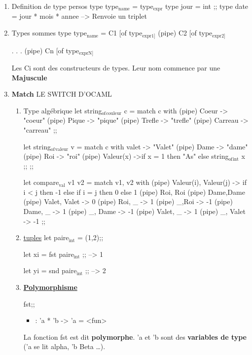 \documentclass[11pt]{article}
\begin{document}
\begin{enumerate}
\item Definition de type persos
\label{sec-1-4-4-1}
type type$_{\text{name}}$ = type$_{\text{expr}}$
type jour = int ;;
type date = jour *  mois * annee --> Renvoie un triplet

\item Types sommes
\label{sec-1-4-4-2}
type type$_{\text{name}}$ = C1 [of type$_{\text{expr1]}}$
                 (pipe) C2 [of type$_{\text{expr2]}}$

.
.
.
(pipe) Cn [of type$_{\text{exprN]}}$ 

Les Ci sont des constructeurs de types. Leur nom commence par une \textbf{Majuscule}

\item \textbf{Match} LE SWITCH D'OCAML
\label{sec-1-4-4-3}

\begin{enumerate}
\item Type algébrique
\label{sec-1-4-4-3-1}
let string$_{\text{of}}$$_{\text{couleur}}$ c = 
   match c with 
   (pipe) Coeur -> "coeur"
   (pipe) Pique -> "pique"
   (pipe) Trefle -> "trefle"
   (pipe) Carreau -> "carreau"
;;


let string$_{\text{of}}$$_{\text{valeur}}$ v = 
   match c with 
   valet -> "Valet"
   (pipe) Dame -> "dame"
   (pipe) Roi -> "roi"
   (pipe) Valeur(x) ->if x = 1 then "As" 
                      else string$_{\text{of}}$$_{\text{int}}$ x ;;
;;

let compare$_{\text{val}}$ v1 v2 = 
    match v1, v2 with 
    (pipe) Valeur(i), Valeur(j) -> 
      if i < j then -1 else if i = j then 0 else 1 
    (pipe) Roi, Roi (pipe) Dame,Dame (pipe)  Valet, Valet -> 0
    (pipe) Roi, \_ -> 1
    (pipe) \_,Roi -> -1
    (pipe) Dame, \_ -> 1
    (pipe) \_, Dame -> -1
    (pipe) Valet, \_ -> 1
    (pipe) \_, Valet -> -1
;;

\item \underline{tuples}
\label{sec-1-4-4-3-2}
let paire$_{\text{int}}$ = (1,2);;

let xi = fst paire$_{\text{int}}$ ;; --> 1

let yi = snd paire$_{\text{int}}$ ;; --> 2
\item \underline{\textbf{Polymorphisme}}
\label{sec-1-4-4-3-3}

fst;;
\begin{itemize}
\item : 'a * 'b -> 'a = <fun>
\end{itemize}
La fonction fst est dit \textbf{polymorphe}. 'a et 'b sont des \textbf{variables de
type} ('a se lit alpha, 'b Beta \ldots{}).


\end{enumerate}
\end{enumerate}
\end{document}
